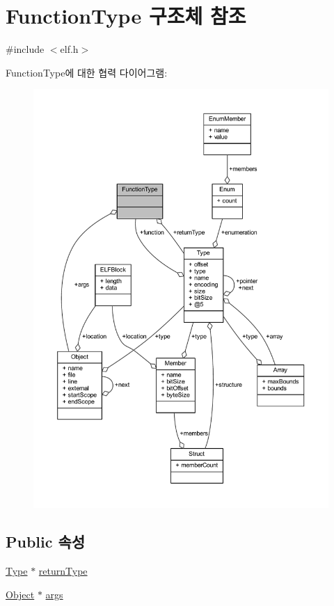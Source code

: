 \hypertarget{struct_function_type}{}\section{Function\+Type 구조체 참조}
\label{struct_function_type}


{\ttfamily \#include $<$elf.\+h$>$}



Function\+Type에 대한 협력 다이어그램\+:\nopagebreak
\begin{figure}[H]
\begin{center}
\leavevmode
\includegraphics[width=350pt]{struct_function_type__coll__graph}
\end{center}
\end{figure}
\subsection*{Public 속성}
\begin{DoxyCompactItemize}
\item 
\mbox{\hyperlink{struct_type}{Type}} $\ast$ \mbox{\hyperlink{struct_function_type_a4512eaeaafe53ef9056acd3314263aaa}{return\+Type}}
\item 
\mbox{\hyperlink{struct_object}{Object}} $\ast$ \mbox{\hyperlink{struct_function_type_ab4656e6133839aaa9b96e48949397a6a}{args}}
\end{DoxyCompactItemize}


